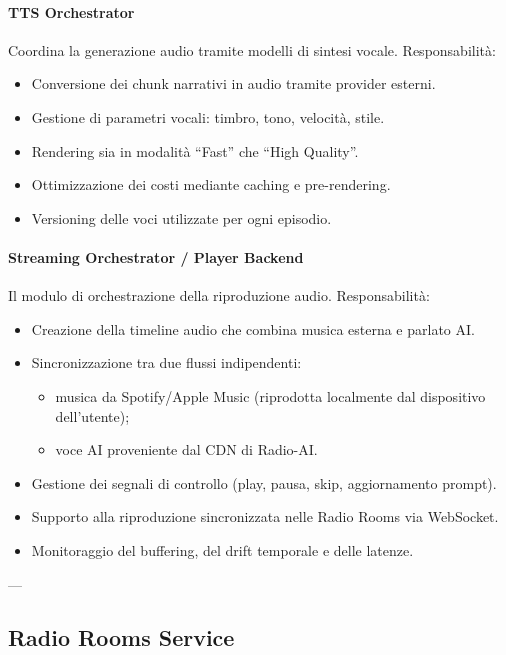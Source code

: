 \documentclass[11pt,a4paper]{article}
\begin{document}
\paragraph{TTS Orchestrator}
Coordina la generazione audio tramite modelli di sintesi vocale.  
Responsabilità:
\begin{itemize}
    \item Conversione dei chunk narrativi in audio tramite provider esterni.
    \item Gestione di parametri vocali: timbro, tono, velocità, stile.
    \item Rendering sia in modalità ``Fast'' che ``High Quality''.
    \item Ottimizzazione dei costi mediante caching e pre-rendering.
    \item Versioning delle voci utilizzate per ogni episodio.
\end{itemize}

\paragraph{Streaming Orchestrator / Player Backend}
Il modulo di orchestrazione della riproduzione audio.  
Responsabilità:
\begin{itemize}
    \item Creazione della timeline audio che combina musica esterna e parlato AI.
    \item Sincronizzazione tra due flussi indipendenti:
    \begin{itemize}
        \item musica da Spotify/Apple Music (riprodotta localmente dal dispositivo dell’utente);
        \item voce AI proveniente dal CDN di Radio-AI.
    \end{itemize}
    \item Gestione dei segnali di controllo (play, pausa, skip, aggiornamento prompt).
    \item Supporto alla riproduzione sincronizzata nelle Radio Rooms via WebSocket.
    \item Monitoraggio del buffering, del drift temporale e delle latenze.
\end{itemize}

---

\subsection{Radio Rooms Service}
\end{document}

